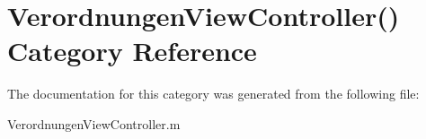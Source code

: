 \hypertarget{category_verordnungen_view_controller_07_08}{}\section{Verordnungen\+View\+Controller() Category Reference}
\label{category_verordnungen_view_controller_07_08}


The documentation for this category was generated from the following file\+:\begin{DoxyCompactItemize}
\item 
Verordnungen\+View\+Controller.\+m\end{DoxyCompactItemize}
